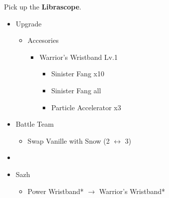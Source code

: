 Pick up the \textbf{Librascope}.

\begin{upgrade}
	\begin{itemize}
		\item Upgrade
			\begin{itemize}
				\item Accesories
					\begin{itemize}
						\item Warrior's Wristband Lv.1
							\begin{itemize}
								\item Sinister Fang x10
								\item Sinister Fang all
								\item Particle Accelerator x3
							\end{itemize}
					\end{itemize}
			\end{itemize}
	\end{itemize}
\end{upgrade}

\begin{menu}
	\begin{itemize}
		\paradigm
		\begin{itemize}
			\item Battle Team
				\begin{itemize}
					\item Swap Vanille with Snow (2 $\leftrightarrow$ 3)
				\end{itemize}
			\item {}%
				  {\paradigmline{\syn}{(\sen)}{(\rav)}}%
			      {\paradigmline[4]{\com}{\rav}{\rav}}%
			      {\paradigmline{(\rav)}{(\sen)}{(\rav)}}%
			      {\paradigmline{\com}{\com}{\rav}}%
			      {\paradigmline{\rav}{(\sen)}{\sab}}%
			      {\paradigmline{\com}{\com}{(\rav)}}%
		\end{itemize}
		\equip
		\begin{itemize}
			\item Sazh
				\begin{itemize}
					\item Power Wristband* $\rightarrow$ Warrior's Wristband*
				\end{itemize}
		\end{itemize}
	\end{itemize}
\end{menu}

\renewcommand{\first}{[1] Riot Shield (\syn/\sen/\rav)}
\renewcommand{\third}{[3] Mystic Tower (\rav/\sen/\rav)}
\renewcommand{\fourth}{[4] Aggression (\com/\com/\rav)}
\renewcommand{\fifth}{[5] Matador (\rav/\sen/\sab)}
\renewcommand{\sixth}{[6] Aggression (\com/\com/\rav)}


